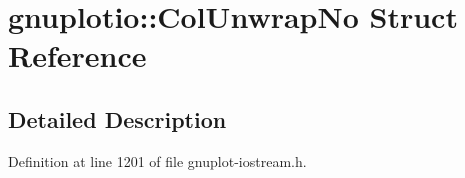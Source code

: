 \hypertarget{structgnuplotio_1_1_col_unwrap_no}{}\section{gnuplotio\+:\+:Col\+Unwrap\+No Struct Reference}
\label{structgnuplotio_1_1_col_unwrap_no}


\subsection{Detailed Description}


Definition at line 1201 of file gnuplot-\/iostream.\+h.


